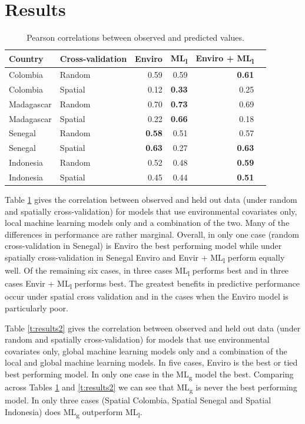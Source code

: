 \documentclass[11pt]{article}
\begin{document}
\section{Results}


\begin{table}[t!]
\caption{Pearson correlations between observed and predicted values. }
\centering
\begin{tabular}{llrrrr}
Country &  Cross-validation & Enviro &  ML\textsubscript{l} &  Enviro + ML\textsubscript{l} \\
\hline 
 Colombia & Random &  0.59 & 0.59 & \textbf{0.61} \\
 Colombia &  Spatial &  0.12 &  \textbf{0.33} &  0.25\\
 Madagascar & Random &   0.70 &  \textbf{0.73} & 0.69 \\
 Madagascar &  Spatial &  0.22 &  \textbf{0.66} & 0.18\\
 Senegal &  Random &  \textbf{0.58} &  0.51 & 0.57 \\
 Senegal &  Spatial &  \textbf{0.63} &  0.27 &  \textbf{0.63} \\
 Indonesia &  Random &  0.52 &  0.48 &  \textbf{0.59} \\
 Indonesia &  Spatial &  0.45 &  0.44 &  \textbf{0.51} \\
\end{tabular}
\label{t:results}
\end{table}



Table \ref{t:results} gives the correlation between observed and held out data (under random and spatially cross-validation) for models that use environmental covariates only, local machine learning models only and a combination of the two.
Many of the differences in performance are rather marginal.
Overall, in only one case (random cross-validation in Senegal) is Enviro the best performing model while under spatially cross-validation in Senegal Enviro and Envir + ML\textsubscript{l} perform equally well.
Of the remaining six cases, in three cases ML\textsubscript{l} performs best and in three cases Envir + ML\textsubscript{l} performs best.
The greatest benefits in predictive performance occur under spatial cross validation and in the cases when the Enviro model is particularly poor.

Table \ref{t:results2} gives the correlation between observed and held out data (under random and spatially cross-validation) for models that use environmental covariates only, global machine learning models only and a combination of the local and global machine learning models.
In five cases, Enviro is the best or tied best performing model.
In only one case in the ML\textsubscript{g} model the best.
Comparing across Tables \ref{t:results} and \ref{t:results2} we can see that ML\textsubscript{g} is never the best performing model.
In only three cases (Spatial Colombia, Spatial Senegal and Spatial Indonesia) does ML\textsubscript{g} outperform ML\textsubscript{l}.
\end{document}
